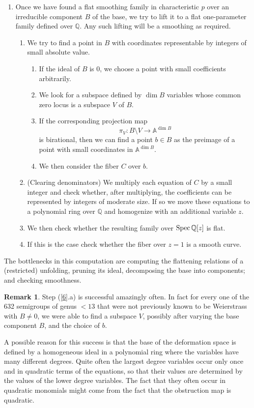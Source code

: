 \documentclass[twoside,12pt, leqno]{amsart}
\theoremstyle{definition}
\newtheorem{remark}[theorem]{Remark}
\def\AA{{\mathbb A}}
\def\QQ{{\mathbb Q}}
\DeclareMathOperator{\Spec}{{Spec}}
\def\Spec{{{\rm Spec}\,}}
\begin{document}
\begin{enumerate}
\begin{enumerate}
\end{enumerate}

\item \label{6} Once we have found a flat smoothing family in characteristic $p$ over an irreducible component $B$ of the base, we try to lift it to a flat one-parameter family defined over $\QQ$. Any such lifting will be a smoothing as required.

\begin{enumerate}
 \item We try to find a point in $B$ with coordinates representable by integers of small absolute value. 
 \begin{enumerate}
     \item If the ideal of  $B$ is 0, we choose a point with small coefficients arbitrarily.
     \item We look for a subspace defined by $\dim B$ variables  whose common zero locus is a subspace $V$ of $B$.
    \item If the corresponding projection  map
    $$ \pi_{V}\colon B\setminus V \to \AA^{\dim B}$$ 
     is birational, then we can find a point $b\in B$ as the preimage of a point with small coordinates
    in $\AA^{\dim B}$.
  
   \item We then consider the fiber $C$ over $b$.
   \end{enumerate}
 \item (Clearing denominators) We multiply each equation of $C$ by a small integer and check whether, after multiplying, the coefficients can be represented by  integers of moderate size. If so we move these  equations to a polynomial ring over $\QQ$ and homogenize with an additional variable $z$.
 \item We then check whether the resulting family over $\Spec \QQ[z]$ is flat.
 \item If this is the case check whether the fiber over $z=1$ is a smooth curve.    
 \end{enumerate}
\end{enumerate}

The bottlenecks in this computation are computing  the flattening relations of a (restricted) unfolding, pruning its ideal, decomposing the base into  components; and checking smoothness. 

\begin{remark}
Step (\ref{6}.a) is  successful amazingly often. In fact for every one of the 632 semigroups of genus $<13$ that were not previously known to be Weierstrass with $B\neq 0$, we were able to find a subspace $V$, possibly after varying the base component $B$, and the choice of $b$. 

 A possible reason for this success is that the base of the deformation space is defined by a homogeneous ideal in a polynomial ring where  the variables have many different degrees. Quite often the largest degree variables occur only once and in quadratic terms of the equations, so that their values are determined by the values of the lower degree variables.
The fact that they often occur in quadratic monomials might come from the fact that the obstruction map is quadratic.
\end{remark}

 

                  

\end{document}
